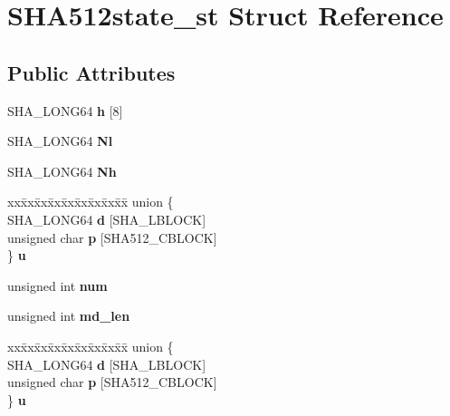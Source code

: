 \hypertarget{structSHA512state__st}{}\section{S\+H\+A512state\+\_\+st Struct Reference}
\label{structSHA512state__st}
\subsection*{Public Attributes}
\begin{DoxyCompactItemize}
\item 
\mbox{\label{structSHA512state__st_acdf1f5c14fa375d20397ae8a04df07a1}} 
S\+H\+A\+\_\+\+L\+O\+N\+G64 {\bfseries h} \mbox{[}8\mbox{]}
\item 
\mbox{\label{structSHA512state__st_a8adc6d1037d156b3adcb14773fa8fe90}} 
S\+H\+A\+\_\+\+L\+O\+N\+G64 {\bfseries Nl}
\item 
\mbox{\label{structSHA512state__st_acfe2405c1f495e7fe24c837ef4a7a9e1}} 
S\+H\+A\+\_\+\+L\+O\+N\+G64 {\bfseries Nh}
\item 
\mbox{\label{structSHA512state__st_a70ce8c1ae0d95c899e6c806928dbc761}} 
\begin{tabbing}
xx\=xx\=xx\=xx\=xx\=xx\=xx\=xx\=xx\=\kill
union \{\\
\>SHA\_LONG64 {\bfseries d} \mbox{[}SHA\_LBLOCK\mbox{]}\\
\>unsigned char {\bfseries p} \mbox{[}SHA512\_CBLOCK\mbox{]}\\
\} {\bfseries u}\\

\end{tabbing}\item 
\mbox{\label{structSHA512state__st_ae3ba23906ed2416ed3fae1765cf3c0f0}} 
unsigned int {\bfseries num}
\item 
\mbox{\label{structSHA512state__st_ac2699bd40af3279042712d23b79fb3db}} 
unsigned int {\bfseries md\+\_\+len}
\item 
\mbox{\label{structSHA512state__st_a41df6aef43e72888936181d365a23081}} 
\begin{tabbing}
xx\=xx\=xx\=xx\=xx\=xx\=xx\=xx\=xx\=\kill
union \{\\
\>SHA\_LONG64 {\bfseries d} \mbox{[}SHA\_LBLOCK\mbox{]}\\
\>unsigned char {\bfseries p} \mbox{[}SHA512\_CBLOCK\mbox{]}\\
\} {\bfseries u}\\


\end{tabbing}
\end{DoxyCompactItemize}
